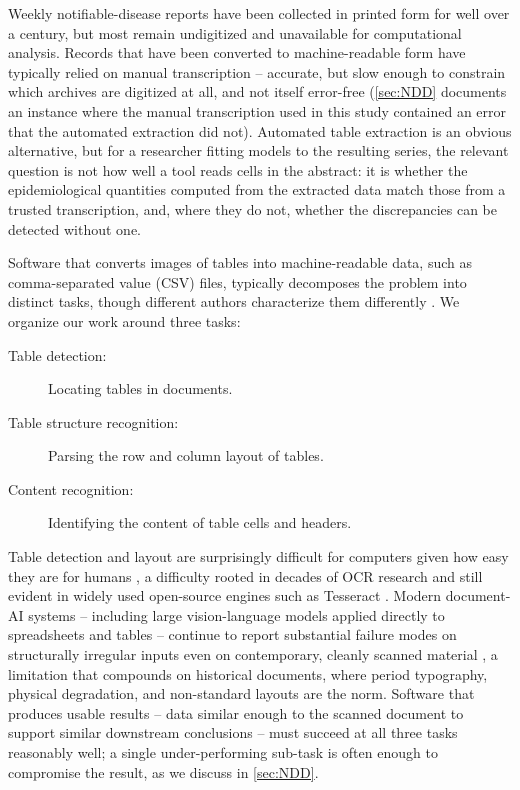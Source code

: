 \documentclass[12pt]{article}
\begin{document}
Weekly notifiable-disease reports have been collected in printed form for well over a century, but most remain undigitized and unavailable for computational analysis. Records that have been converted to machine-readable form have typically relied on manual transcription -- accurate, but slow enough to constrain which archives are digitized at all, and not itself error-free (\cref{sec:NDD} documents an instance where the manual transcription used in this study contained an error that the automated extraction did not). Automated table extraction is an obvious alternative, but for a researcher fitting models to the resulting series, the relevant question is not how well a tool reads cells in the abstract: it is whether the epidemiological quantities computed from the extracted data match those from a trusted transcription, and, where they do not, whether the discrepancies can be detected without one.

Software that converts images of tables into machine-readable data, such as comma-separated value (CSV) files, typically decomposes the problem into distinct tasks, though different authors characterize them differently \cite{zhong2020image}. We organize our work around three tasks:
\begin{description}
    \item[Table detection:] Locating tables in documents.
    \item[Table structure recognition:] Parsing the row and column layout of tables.
    \item[Content recognition:] Identifying the content of table cells and headers.
\end{description}
Table detection and layout are surprisingly difficult for computers given how easy they are for humans \cite{hu2002evaluating}, a difficulty rooted in decades of OCR research \cite{Mori1992} and still evident in widely used open-source engines such as Tesseract \cite{TessOverview}. Modern document-AI systems -- including large vision-language models applied directly to spreadsheets and tables -- continue to report substantial failure modes on structurally irregular inputs even on contemporary, cleanly scanned material \cite{xia2024vision,Sahasrabudhe2025}, a limitation that compounds on historical documents, where period typography, physical degradation, and non-standard layouts are the norm. Software that produces usable results -- data similar enough to the scanned document to support similar downstream conclusions -- must succeed at all three tasks reasonably well; a single under-performing sub-task is often enough to compromise the result, as we discuss in \cref{sec:NDD}.
\end{document}
